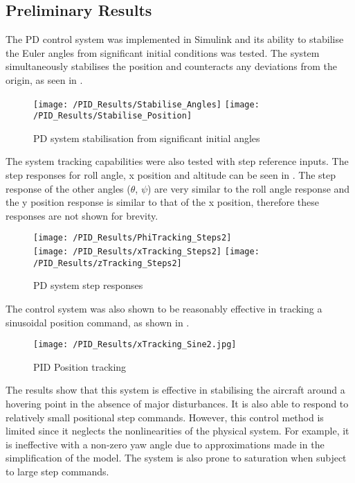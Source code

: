 \FloatBarrier

\subsection{Preliminary Results}
The PD control system was implemented in Simulink and its ability to stabilise the Euler angles from significant initial conditions was tested. The system simultaneously stabilises the position and counteracts any deviations from the origin, as seen in .
\begin{figure}[htb]
\begin{center}
	\texttt{[image: /PID\_Results/Stabilise\_Angles]}
	\texttt{[image: /PID\_Results/Stabilise\_Position]}%
	\end{center}
	\caption{PD system stabilisation from significant initial angles}%
	\label{fig:PID_Stabilise}%
\end{figure}

The system tracking capabilities were also tested with step reference inputs. The step responses for roll angle, x position and altitude can be seen in . The step response of the other angles ($\theta$, $\psi$) are very similar to the roll angle response and the y position response is similar to that of the x position, therefore these responses are not shown for brevity.
\begin{figure}[htb]
\begin{center}
	\texttt{[image: /PID\_Results/PhiTracking\_Steps2]}\\
	\texttt{[image: /PID\_Results/xTracking\_Steps2]}%
	\texttt{[image: /PID\_Results/zTracking\_Steps2]}%
	\end{center}
	\caption{PD system step responses}%
	\label{fig:PID_Results}%
\end{figure}
The control system was also shown to be reasonably effective in tracking a sinusoidal position command, as shown in .
\begin{figure}[htb]
\begin{center}
	\texttt{[image: /PID\_Results/xTracking\_Sine2.jpg]}%
	\end{center}
	\caption{PID Position tracking}%
	\label{fig:PID_Sine}%
\end{figure}

The results show that this system is effective in stabilising the aircraft around a hovering point in the absence of major disturbances. It is also able to respond to relatively small positional step commands. However, this control method is limited since it neglects the nonlinearities of the physical system. For example, it is ineffective with a non-zero yaw angle due to approximations made in the simplification of the model. The system is also prone to saturation when subject to large step commands.

